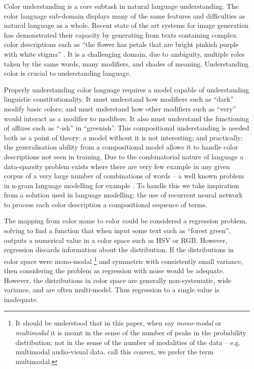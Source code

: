 \documentclass[11pt,letterpaper]{article}
\newcommand{\parencite}{\cite}
\newcommand{\textcite}{\newcite}
\begin{document}
Color understanding is a core subtask in natural language understanding.
The color language sub-domain displays many of the same features and difficulties as natural language as a whole.
Recent state of the art systems for image generation has demonstrated their capacity by generating from texts containing complex color descriptions such as ``the flower has petals that 
are bright pinkish purple with white stigma'' \parencite{reed2016generative, 2015arXiv151102793M}.
It is a challenging domain, due to ambiguity, multiple roles taken by the same words, many modifiers, and shades of meaning.
Understanding color is crucial to understanding language. 

Properly understanding color language requires a model capable of understanding linguistic constitutionality.
It must understand how modifiers such as ``dark'' modify basic colors; and must understand how other modifiers such as ``very'' would interact as a modifier to modifiers.
It also must understand the functioning of affixes such as ``-ish'' in ``greenish''.
This compositional understanding is needed both as a point of theory: a model without it is not interesting; and practically: the generalisation ability from a compositional model allows it to handle color descriptions not seen in training.
Due to the combinatorial nature of language a data-sparsity problem exists where there are very few example in any given corpus of a very large number of combinations of words -- a well known problem in n-gram language modelling for example \parencite{kneser1995improved,chen1996empirical,rosenfeld2000two}.
To handle this we take inspiration from a solution used in language modelling: the use of recurrent neural network \parencite{mikolov2010recurrent,mikolov2011RnnLM} to process each color description a compositional sequence of terms.


The mapping from color name to color could be considered a regression problem, solving to find a function that when input some text such as ``forest green'', outputs a numerical value in a color space such as HSV or RGB.
However, regression discards information about the distribution.
If the distributions in color space were mono-modal
\footnote{It should be understood that in this paper, when say \emph{mono-modal} or \emph{multimodal} it is meant in the sense of the number of peaks in the probability distribution; not in the sense of the number of modalities of the data -- e.g. multimodal audio-visual data. 
\textcite{mcmahan2015bayesian} call this convex, we prefer the term multimodal.}
and symmetric with consistently small variance, then considering the problem as regression with noise would be adequate.
However, the distributions in color space are generally non-systematic, wide variance, and are often multi-model.
Thus regression to a single value is inadequate.
 
\end{document}

